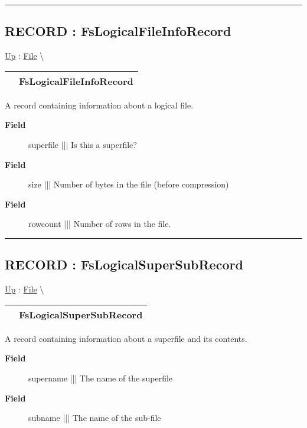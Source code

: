 \rule{\linewidth}{0.5pt}
\subsection*{RECORD : FsLogicalFileInfoRecord}
\hypertarget{ecldoc:file.fslogicalfileinforecord}{}
\hyperlink{ecldoc:File}{Up} :
\hspace{0pt} \hyperlink{ecldoc:File}{File} \textbackslash 

{\renewcommand{\arraystretch}{1.5}
\begin{tabularx}{\textwidth}{|>{\raggedright\arraybackslash}l|X|}
\hline
\hspace{0pt} & FsLogicalFileInfoRecord \\
\hline
\end{tabularx}
}

\par
A record containing information about a logical file.

\par
\begin{description}
\item [\textbf{Field}] superfile ||| Is this a superfile?
\item [\textbf{Field}] size ||| Number of bytes in the file (before compression)
\item [\textbf{Field}] rowcount ||| Number of rows in the file.
\end{description}

\rule{\linewidth}{0.5pt}
\subsection*{RECORD : FsLogicalSuperSubRecord}
\hypertarget{ecldoc:file.fslogicalsupersubrecord}{}
\hyperlink{ecldoc:File}{Up} :
\hspace{0pt} \hyperlink{ecldoc:File}{File} \textbackslash 

{\renewcommand{\arraystretch}{1.5}
\begin{tabularx}{\textwidth}{|>{\raggedright\arraybackslash}l|X|}
\hline
\hspace{0pt} & FsLogicalSuperSubRecord \\
\hline
\end{tabularx}
}

\par
A record containing information about a superfile and its contents.

\par
\begin{description}
\item [\textbf{Field}] supername ||| The name of the superfile
\item [\textbf{Field}] subname ||| The name of the sub-file
\end{description}

